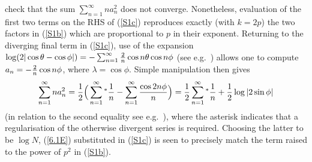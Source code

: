 \documentclass[11pt,a4paper]{article}
\numberwithin{equation}{section} %
\theoremstyle{plain}
\theoremstyle{definition}
\numberwithin{prop}{section}
\numberwithin{cor}{section}
\numberwithin{remark}{section}
\begin{document}
check that the sum $\sum_{n=1}^\infty n a_n^2$ does not converge. Nonetheless, evaluation of the first two terms on the RHS of (\ref{S1c}) reproduces exactly (with $k=2p$) the two
factors in (\ref{S1b}) which are proportional to $p$ in their exponent. Returning to the diverging final term in (\ref{S1c}), use of the expansion 
$\log(2|\cos \theta - \cos \phi|) = - \sum_{n=1}^\infty {2 \over n} \cos n \theta \cos n \phi$ (see e.g.~\cite[Exercises 1.4 q.4]{Fo10}) allows one 
 to compute  $a_n = - {2 \over n} \cos n \phi$, where $\lambda = \cos \phi$. Simple manipulation then gives
   \begin{equation}\label{6.1E}
  \sum_{n=1}^\infty n a_n^2 ={1 \over 2}  \Big ( \sum_{n=1}^\infty {}^* {1 \over n} - \sum_{n=1}^\infty {\cos 2 n \phi \over n} \Big ) ={1 \over 2} \sum_{n=1}^\infty {}^* {1 \over n} +
{1 \over 2}  \log |2 \sin \phi|
  \end{equation}   
(in relation to the second equality see e.g.~\cite[Eq.~(14.95)]{Fo10}), where the asterisk indicates that a regularisation of the otherwise
divergent series is required.    Choosing the latter to be $\log N$, (\ref{6.1E}) substituted in (\ref{S1c}) is seen to precisely match the term raised to the power
of $p^2$ in (\ref{S1b}).
\end{document}
